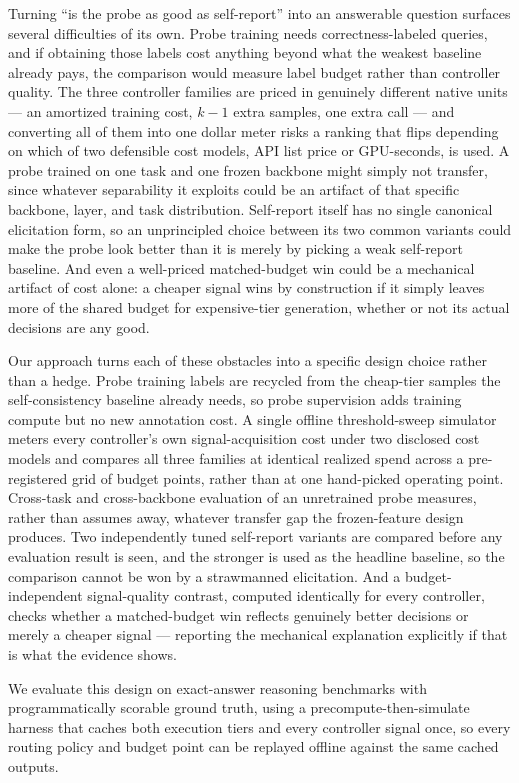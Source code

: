 \documentclass[11pt]{article}
\begin{document}
Turning ``is the probe as good as self-report'' into an answerable question surfaces several difficulties of its own. Probe training needs correctness-labeled queries, and if obtaining those labels cost anything beyond what the weakest baseline already pays, the comparison would measure label budget rather than controller quality. The three controller families are priced in genuinely different native units --- an amortized training cost, $k-1$ extra samples, one extra call --- and converting all of them into one dollar meter risks a ranking that flips depending on which of two defensible cost models, API list price or GPU-seconds, is used. A probe trained on one task and one frozen backbone might simply not transfer, since whatever separability it exploits could be an artifact of that specific backbone, layer, and task distribution. Self-report itself has no single canonical elicitation form, so an unprincipled choice between its two common variants could make the probe look better than it is merely by picking a weak self-report baseline. And even a well-priced matched-budget win could be a mechanical artifact of cost alone: a cheaper signal wins by construction if it simply leaves more of the shared budget for expensive-tier generation, whether or not its actual decisions are any good.

Our approach turns each of these obstacles into a specific design choice rather than a hedge. Probe training labels are recycled from the cheap-tier samples the self-consistency baseline already needs, so probe supervision adds training compute but no new annotation cost. A single offline threshold-sweep simulator meters every controller's own signal-acquisition cost under two disclosed cost models and compares all three families at identical realized spend across a pre-registered grid of budget points, rather than at one hand-picked operating point. Cross-task and cross-backbone evaluation of an unretrained probe measures, rather than assumes away, whatever transfer gap the frozen-feature design produces. Two independently tuned self-report variants are compared before any evaluation result is seen, and the stronger is used as the headline baseline, so the comparison cannot be won by a strawmanned elicitation. And a budget-independent signal-quality contrast, computed identically for every controller, checks whether a matched-budget win reflects genuinely better decisions or merely a cheaper signal --- reporting the mechanical explanation explicitly if that is what the evidence shows.

We evaluate this design on exact-answer reasoning benchmarks with programmatically scorable ground truth, using a precompute-then-simulate harness that caches both execution tiers and every controller signal once, so every routing policy and budget point can be replayed offline against the same cached outputs.
\end{document}
